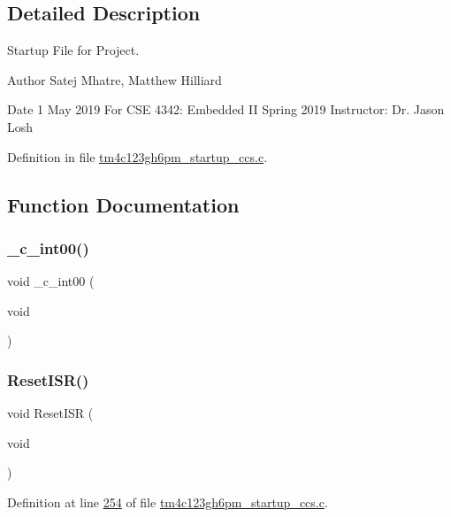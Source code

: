\subsection{Detailed Description}
Startup File for Project. 

\begin{DoxyAuthor}{Author}
Satej Mhatre, Matthew Hilliard 
\end{DoxyAuthor}
\begin{DoxyDate}{Date}
1 May 2019 For C\+SE 4342\+: Embedded II Spring 2019 Instructor\+: Dr. Jason Losh 
\end{DoxyDate}


Definition in file \mbox{\hyperlink{tm4c123gh6pm__startup__ccs_8c_source}{tm4c123gh6pm\+\_\+startup\+\_\+ccs.\+c}}.



\subsection{Function Documentation}
\mbox{\label{tm4c123gh6pm__startup__ccs_8c_a3c8534f5781f4cf53ffbeb6d35880b27}} 
\subsubsection{\texorpdfstring{\_c\_int00()}{\_c\_int00()}}
{\footnotesize\ttfamily void \+\_\+c\+\_\+int00 (\begin{DoxyParamCaption}\item[{void}]{ }\end{DoxyParamCaption})}

\mbox{\label{tm4c123gh6pm__startup__ccs_8c_a516ff8924be921fa3a1bb7754b1f5734}} 
\subsubsection{\texorpdfstring{ResetISR()}{ResetISR()}}
{\footnotesize\ttfamily void Reset\+I\+SR (\begin{DoxyParamCaption}\item[{void}]{ }\end{DoxyParamCaption})}



Definition at line \mbox{\hyperlink{tm4c123gh6pm__startup__ccs_8c_source_l00254}{254}} of file \mbox{\hyperlink{tm4c123gh6pm__startup__ccs_8c_source}{tm4c123gh6pm\+\_\+startup\+\_\+ccs.\+c}}.


